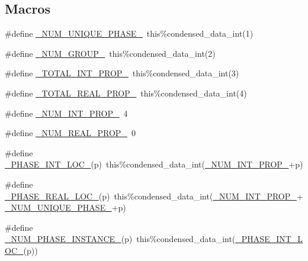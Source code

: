 \subsection*{Macros}
\begin{DoxyCompactItemize}
\item 
\#define \mbox{\hyperlink{sub__model___u_n_i_f_a_c_8_f90_a7777e624e1e25887312ddd07d3eceed2}{\+\_\+\+N\+U\+M\+\_\+\+U\+N\+I\+Q\+U\+E\+\_\+\+P\+H\+A\+S\+E\+\_\+}}~this\%condensed\+\_\+data\+\_\+int(1)
\item 
\#define \mbox{\hyperlink{sub__model___u_n_i_f_a_c_8_f90_aaf6ff3fa100a1fa0baec9dba65df6891}{\+\_\+\+N\+U\+M\+\_\+\+G\+R\+O\+U\+P\+\_\+}}~this\%condensed\+\_\+data\+\_\+int(2)
\item 
\#define \mbox{\hyperlink{sub__model___u_n_i_f_a_c_8_f90_a5d16e33ffa12f822fd64d753333b1db2}{\+\_\+\+T\+O\+T\+A\+L\+\_\+\+I\+N\+T\+\_\+\+P\+R\+O\+P\+\_\+}}~this\%condensed\+\_\+data\+\_\+int(3)
\item 
\#define \mbox{\hyperlink{sub__model___u_n_i_f_a_c_8_f90_af3d6a6340786de89f499a97df4e208c7}{\+\_\+\+T\+O\+T\+A\+L\+\_\+\+R\+E\+A\+L\+\_\+\+P\+R\+O\+P\+\_\+}}~this\%condensed\+\_\+data\+\_\+int(4)
\item 
\#define \mbox{\hyperlink{sub__model___u_n_i_f_a_c_8_f90_a54f7194dc6a244f7eb7a78f88b3362ba}{\+\_\+\+N\+U\+M\+\_\+\+I\+N\+T\+\_\+\+P\+R\+O\+P\+\_\+}}~4
\item 
\#define \mbox{\hyperlink{sub__model___u_n_i_f_a_c_8_f90_a242fac7fe42c0d62936c65735dc023a6}{\+\_\+\+N\+U\+M\+\_\+\+R\+E\+A\+L\+\_\+\+P\+R\+O\+P\+\_\+}}~0
\item 
\#define \mbox{\hyperlink{sub__model___u_n_i_f_a_c_8_f90_a1d3113ce4335ed8f59d5278a96baf2db}{\+\_\+\+P\+H\+A\+S\+E\+\_\+\+I\+N\+T\+\_\+\+L\+O\+C\+\_\+}}(p)~this\%condensed\+\_\+data\+\_\+int(\mbox{\hyperlink{sub__model___u_n_i_f_a_c_8_f90_a54f7194dc6a244f7eb7a78f88b3362ba}{\+\_\+\+N\+U\+M\+\_\+\+I\+N\+T\+\_\+\+P\+R\+O\+P\+\_\+}}+p)
\item 
\#define \mbox{\hyperlink{sub__model___u_n_i_f_a_c_8_f90_a82db0e0fff4e8ab602fb50bebe0b7c38}{\+\_\+\+P\+H\+A\+S\+E\+\_\+\+R\+E\+A\+L\+\_\+\+L\+O\+C\+\_\+}}(p)~this\%condensed\+\_\+data\+\_\+int(\mbox{\hyperlink{sub__model___u_n_i_f_a_c_8_f90_a54f7194dc6a244f7eb7a78f88b3362ba}{\+\_\+\+N\+U\+M\+\_\+\+I\+N\+T\+\_\+\+P\+R\+O\+P\+\_\+}}+\mbox{\hyperlink{sub__model___u_n_i_f_a_c_8_f90_a7777e624e1e25887312ddd07d3eceed2}{\+\_\+\+N\+U\+M\+\_\+\+U\+N\+I\+Q\+U\+E\+\_\+\+P\+H\+A\+S\+E\+\_\+}}+p)
\item 
\#define \mbox{\hyperlink{sub__model___u_n_i_f_a_c_8_f90_ad23acf7c0b198dc8792d7404114004ea}{\+\_\+\+N\+U\+M\+\_\+\+P\+H\+A\+S\+E\+\_\+\+I\+N\+S\+T\+A\+N\+C\+E\+\_\+}}(p)~this\%condensed\+\_\+data\+\_\+int(\mbox{\hyperlink{sub__model___u_n_i_f_a_c_8_f90_a1d3113ce4335ed8f59d5278a96baf2db}{\+\_\+\+P\+H\+A\+S\+E\+\_\+\+I\+N\+T\+\_\+\+L\+O\+C\+\_\+}}(p))

\end{DoxyCompactItemize}
